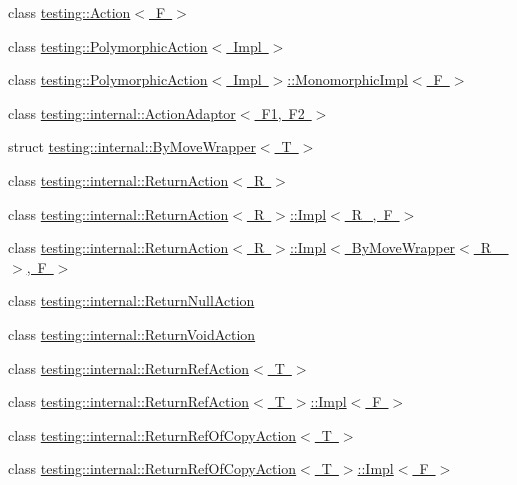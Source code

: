 \begin{DoxyCompactItemize}
\item 
class \mbox{\hyperlink{classtesting_1_1_action}{testing\+::\+Action$<$ F $>$}}
\item 
class \mbox{\hyperlink{classtesting_1_1_polymorphic_action}{testing\+::\+Polymorphic\+Action$<$ Impl $>$}}
\item 
class \mbox{\hyperlink{classtesting_1_1_polymorphic_action_1_1_monomorphic_impl}{testing\+::\+Polymorphic\+Action$<$ Impl $>$\+::\+Monomorphic\+Impl$<$ F $>$}}
\item 
class \mbox{\hyperlink{classtesting_1_1internal_1_1_action_adaptor}{testing\+::internal\+::\+Action\+Adaptor$<$ F1, F2 $>$}}
\item 
struct \mbox{\hyperlink{structtesting_1_1internal_1_1_by_move_wrapper}{testing\+::internal\+::\+By\+Move\+Wrapper$<$ T $>$}}
\item 
class \mbox{\hyperlink{classtesting_1_1internal_1_1_return_action}{testing\+::internal\+::\+Return\+Action$<$ R $>$}}
\item 
class \mbox{\hyperlink{classtesting_1_1internal_1_1_return_action_1_1_impl}{testing\+::internal\+::\+Return\+Action$<$ R $>$\+::\+Impl$<$ R\+\_\+, F $>$}}
\item 
class \mbox{\hyperlink{classtesting_1_1internal_1_1_return_action_1_1_impl_3_01_by_move_wrapper_3_01_r___01_4_00_01_f_01_4}{testing\+::internal\+::\+Return\+Action$<$ R $>$\+::\+Impl$<$ By\+Move\+Wrapper$<$ R\+\_\+ $>$, F $>$}}
\item 
class \mbox{\hyperlink{classtesting_1_1internal_1_1_return_null_action}{testing\+::internal\+::\+Return\+Null\+Action}}
\item 
class \mbox{\hyperlink{classtesting_1_1internal_1_1_return_void_action}{testing\+::internal\+::\+Return\+Void\+Action}}
\item 
class \mbox{\hyperlink{classtesting_1_1internal_1_1_return_ref_action}{testing\+::internal\+::\+Return\+Ref\+Action$<$ T $>$}}
\item 
class \mbox{\hyperlink{classtesting_1_1internal_1_1_return_ref_action_1_1_impl}{testing\+::internal\+::\+Return\+Ref\+Action$<$ T $>$\+::\+Impl$<$ F $>$}}
\item 
class \mbox{\hyperlink{classtesting_1_1internal_1_1_return_ref_of_copy_action}{testing\+::internal\+::\+Return\+Ref\+Of\+Copy\+Action$<$ T $>$}}
\item 
class \mbox{\hyperlink{classtesting_1_1internal_1_1_return_ref_of_copy_action_1_1_impl}{testing\+::internal\+::\+Return\+Ref\+Of\+Copy\+Action$<$ T $>$\+::\+Impl$<$ F $>$}}
\item 

\end{DoxyCompactItemize}
